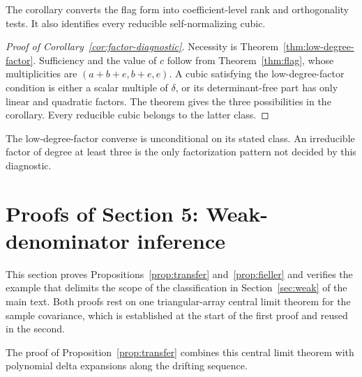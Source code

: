 \documentclass[12pt,a4paper]{article}
\theoremstyle{plain}
\theoremstyle{definition}
\begin{document}
The corollary converts the flag form into coefficient-level rank and orthogonality tests.
It also identifies every reducible self-normalizing cubic.

\begin{proof}[Proof of Corollary~\ref{cor:factor-diagnostic}]
    Necessity is Theorem~\ref{thm:low-degree-factor}.
    Sufficiency and the value of $c$ follow from Theorem~\ref{thm:flag}, whose multiplicities are $(a+b+e,b+e,e)$.
    A cubic satisfying the low-degree-factor condition is either a scalar multiple of $\delta$, or its determinant-free part has only linear and quadratic factors.
    The theorem gives the three possibilities in the corollary.
    Every reducible cubic belongs to the latter class.
\end{proof}

The low-degree-factor converse is unconditional on its stated class.
An irreducible factor of degree at least three is the only factorization pattern not decided by this diagnostic.


\section{Proofs of Section 5: Weak-denominator inference}
\label{supp:weak-proofs}
This section proves Propositions~\ref{prop:transfer} and~\ref{prop:fieller} and verifies the example that delimits the scope of the classification in Section~\ref{sec:weak} of the main text.
Both proofs rest on one triangular-array central limit theorem for the sample covariance, which is established at the start of the first proof and reused in the second.

The proof of Proposition~\ref{prop:transfer} combines this central limit theorem with polynomial delta expansions along the drifting sequence.
\end{document}
